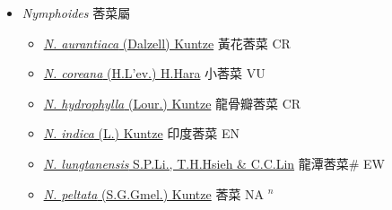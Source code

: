 
  \begin{itemize}
 \item[] \textit{Nymphoides} 莕菜屬
                    
  \begin{itemize}
        \item[] \href{http://www.theplantlist.org/tpl1.1/search?q=Nymphoides+aurantiaca}{\textit{N. aurantiaca} (Dalzell) Kuntze}   黃花莕菜 CR
        \item[] \href{http://www.theplantlist.org/tpl1.1/search?q=Nymphoides+coreana}{\textit{N. coreana} (H.L'ev.) H.Hara}   小莕菜 VU
        \item[] \href{http://www.theplantlist.org/tpl1.1/search?q=Nymphoides+hydrophylla}{\textit{N. hydrophylla} (Lour.) Kuntze}   龍骨瓣莕菜 CR
        \item[] \href{http://www.theplantlist.org/tpl1.1/search?q=Nymphoides+indica}{\textit{N. indica} (L.) Kuntze}   印度莕菜 EN
        \item[] \href{http://www.theplantlist.org/tpl1.1/search?q=Nymphoides+lungtanensis}{\textit{N. lungtanensis} S.P.Li., T.H.Hsieh \& C.C.Lin}   龍潭莕菜\# EW
        \item[] \href{http://www.theplantlist.org/tpl1.1/search?q=Nymphoides+peltata}{\textit{N. peltata} (S.G.Gmel.) Kuntze}   莕菜 NA $^n$
  \end{itemize}
  \end{itemize}
